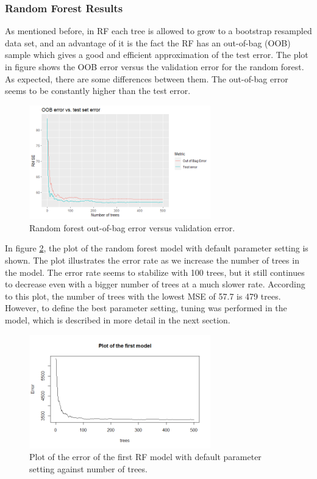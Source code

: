 \documentclass{usiinftr}
\begin{document}
\subsubsection{Random Forest Results}
As mentioned before, in RF each tree is allowed to grow to a bootstrap resampled data set, and an advantage of it is the fact the RF has an out-of-bag (OOB) sample which gives a good and efficient approximation of the test error. The plot in figure \label{RFOOB} shows the OOB error versus the validation error for the random forest. As expected, there are some differences between them. The out-of-bag error seems to be constantly higher than the test error. 

\begin{figure}[h!] 
\centering
\includegraphics[width=0.7\textwidth]{images/image125.png}
\caption{Random forest out-of-bag error versus validation error.}
\label{RFOOB}
\end{figure}

In figure \ref{RFtrees}, the plot of the random forest model with default parameter setting is shown. The plot illustrates the error rate as we increase the number of trees in the model. The error rate seems to stabilize with 100 trees, but it still continues to decrease even with a bigger number of trees at a much slower rate. According to this plot, the number of trees with the lowest MSE of 57.7 is 479 trees. However, to define the best parameter setting, tuning was performed in the model, which is described in more detail in the next section. 

\begin{figure}[h!] 
\centering
\includegraphics[width=0.7\textwidth]{images/image118.png}
\caption{Plot of the error of the first RF model with default parameter setting against number of trees.}
\label{RFtrees}
\end{figure}
\end{document}
